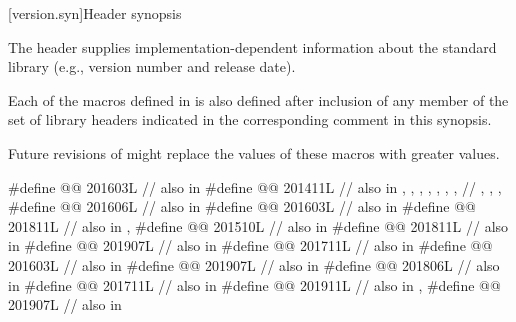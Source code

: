 [version.syn]{Header  synopsis}

\pnum
The header 
supplies implementation-dependent information
about the \Cpp{} standard library
(e.g., version number and release date).

\pnum
Each of the macros defined in  is also defined
after inclusion of any member of the set of library headers
indicated in the corresponding comment in this synopsis.
\begin{note}
Future revisions of \Cpp{} might replace
the values of these macros with greater values.
\end{note}

\begin{codeblock}
#define @@               201603L // also in 
#define @@  201411L
  // also in , , , , , , ,
  // , , , 
#define @@                               201606L // also in 
#define @@                             201603L // also in 
#define @@                   201811L // also in , 
#define @@                          201510L // also in 
#define @@                    201811L // also in 
#define @@                  201907L // also in 
#define @@                      201711L // also in 
#define @@        201603L // also in 
#define @@     201907L // also in 
#define @@                        201806L // also in 
#define @@                 201711L // also in 
#define @@       201911L // also in , 
#define @@                       201907L // also in 

\end{codeblock}
